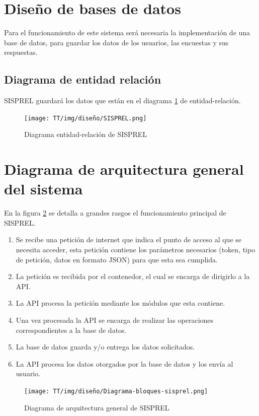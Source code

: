 \section{Diseño de bases de datos}
Para el funcionamiento de este sistema será necesaria la implementación de una base de datos, para guardar los datos de los usuarios, las encuestas y sus respuestas.

\subsection{Diagrama de entidad relación}
SISPREL guardará los datos que están en el diagrama \ref{graphic:entidad-relación} de entidad-relación.

\begin{figure}[!ht]
    \centering
    \texttt{[image: TT/img/diseño/SISPREL.png]}
    \caption{Diagrama entidad-relación de SISPREL}
    \label{graphic:entidad-relación}
\end{figure}

\section{Diagrama de arquitectura general del sistema}
En la figura \ref{graphic:arquitectura-sisprel} se detalla a grandes rasgos el funcionamiento principal de SISPREL.
\begin{enumerate}
    \item Se recibe una petición de internet que indica el punto de acceso al que se necesita acceder, esta petición contiene los parámetros necesarios (token, tipo de petición, datos en formato JSON) para que esta sea cumplida.
    \item La petición es recibida por el contenedor, el cual se encarga de dirigirlo a la API.
    \item La API procesa la petición mediante los módulos que esta contiene.
    \item Una vez procesada la API se encarga de realizar las operaciones correspondientes a la base de datos.
    \item La base de datos guarda y/o entrega los datos solicitados.
    \item La API procesa los datos otorgados por la base de datos y los envía al usuario.
\end{enumerate}

\begin{figure}[!ht]
    \centering
    \texttt{[image: TT/img/diseño/Diagrama-bloques-sisprel.png]}
    \caption{Diagrama de arquitectura general de SISPREL}
    \label{graphic:arquitectura-sisprel}
\end{figure}

